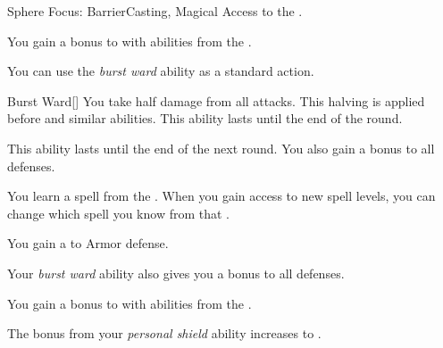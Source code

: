     \begin{feat}{Sphere Focus: Barrier}{Casting, Magical}
        \featpre Access to the  .

         You gain a  bonus to  with abilities from the  .

         You can use the \textit{burst ward} ability as a standard action.
        \begin{freeability}{Burst Ward}[]
            You take half damage from all attacks.
            This halving is applied before  and similar abilities.
            This ability lasts until the end of the round.

            \rankline
             This ability lasts until the end of the next round.
             You also gain a  bonus to all defenses.
        \end{freeability}

         You learn a spell from the  .
        When you gain access to new spell levels, you can change which spell you know from that .

         You gain a   to Armor defense.

         Your \textit{burst ward} ability also gives you a  bonus to all defenses.

         You gain a  bonus to  with abilities from the  .

         The bonus from your \textit{personal shield} ability increases to .
    \end{feat}

